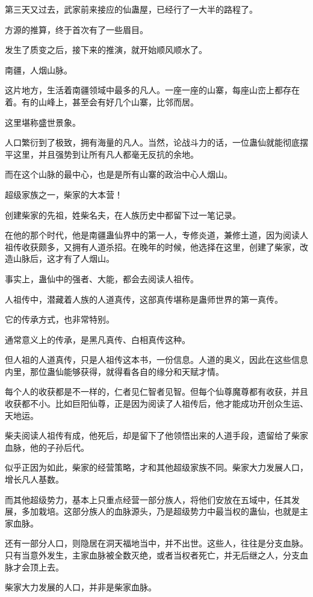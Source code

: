 \begin{this_body}
第三天又过去，武家前来接应的仙蛊屋，已经行了一大半的路程了。

方源的推算，终于首次有了一些眉目。

发生了质变之后，接下来的推演，就开始顺风顺水了。

南疆，人烟山脉。

这片地方，生活着南疆领域中最多的凡人。一座一座的山寨，每座山峦上都存在着。有的山峰上，甚至会有好几个山寨，比邻而居。

这里堪称盛世景象。

人口繁衍到了极致，拥有海量的凡人。当然，论战斗力的话，一位蛊仙就能彻底摆平这里，并且强势到让所有凡人都毫无反抗的余地。

而在这个山脉的最中心，也是是所有山寨的政治中心人烟山。

超级家族之一，柴家的大本营！

创建柴家的先祖，姓柴名夫，在人族历史中都留下过一笔记录。

在他的那个时代，他是南疆蛊仙界中的第一人，专修炎道，兼修土道，因为阅读人祖传收获颇多，又拥有人道杀招。在晚年的时候，他选择在这里，创建了柴家，改造山脉后，这才有了人烟山。

事实上，蛊仙中的强者、大能，都会去阅读人祖传。

人祖传中，潜藏着人族的人道真传，这部真传堪称是蛊师世界的第一真传。

它的传承方式，也非常特别。

通常意义上的传承，是黑凡真传、白相真传这种。

但人祖的人道真传，只是人祖传这本书，一份信息。人道的奥义，因此在这些信息内里，那位蛊仙能够获得，就得看各自的缘分和天赋才情。

每个人的收获都是不一样的，仁者见仁智者见智。但每个仙尊魔尊都有收获，并且收获都不小。比如巨阳仙尊，正是因为阅读了人祖传后，他才能成功开创众生运、天地运。

柴夫阅读人祖传有成，他死后，却是留下了他领悟出来的人道手段，遗留给了柴家血脉，他的子孙后代。

似乎正因为如此，柴家的经营策略，才和其他超级家族不同。柴家大力发展人口，增长凡人基数。

而其他超级势力，基本上只重点经营一部分族人，将他们安放在五域中，任其发展，多加栽培。这部分族人的血脉源头，乃是超级势力中最当权的蛊仙，也就是主家血脉。

还有一部分人口，则隐居在洞天福地当中，并不出世。这些人，往往是分支血脉。只有当意外发生，主家血脉被全数灭绝，或者当权者死亡，并无后继之人，分支血脉才会顶上去。

柴家大力发展的人口，并非是柴家血脉。


\end{this_body}
